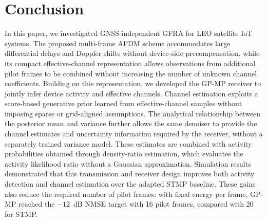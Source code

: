 \section{Conclusion}
\label{sec:conclusion}

In this paper, we investigated GNSS-independent GFRA for LEO satellite
IoT systems. The proposed multi-frame AFDM scheme
accommodates large differential delays and Doppler shifts without
device-side precompensation, while its compact effective-channel
representation allows observations from additional pilot frames to be
combined without increasing the number of unknown channel coefficients.
Building on this representation, we developed the GP-MP receiver to
jointly infer device activity and effective channels. Channel estimation
exploits a score-based generative prior learned from effective-channel
samples without imposing sparse or grid-aligned assumptions. The
analytical relationship between the posterior mean and variance further
allows the same denoiser to provide the channel estimates and uncertainty
information required by the receiver, without a separately trained
variance model. These estimates are combined with activity probabilities
obtained through density-ratio estimation, which evaluates the activity likelihood
ratio without a Gaussian approximation.
Simulation results demonstrated that this transmission and receiver
design improves both activity detection and channel estimation over the
adapted STMP baseline. These gains also reduce the required number
of pilot frames: with fixed energy per frame, GP-MP reached the
$-12$~dB NMSE target with 16 pilot frames, compared with 20 for STMP.
